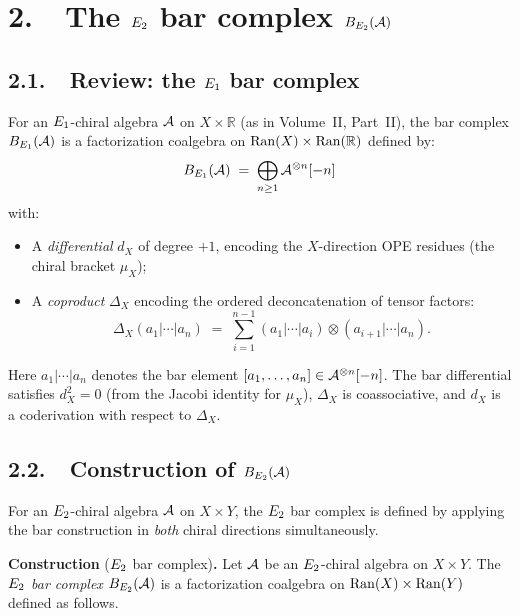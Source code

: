 \section*{2.\ \ The $E_2$ bar complex $B_{E_2}(\mathcal{A})$}
\label{note:sec:e2-bar}

\subsection*{2.1.\ \ Review: the $E_1$ bar complex}

For an $E_1$-chiral algebra $\mathcal{A}$ on $X \times \mathbb{R}$ (as in
Volume~II, Part~II), the bar complex $B_{E_1}(\mathcal{A})$ is a factorization
coalgebra on $\mathrm{Ran}(X) \times \mathrm{Ran}(\mathbb{R})$ defined by:
\[
 B_{E_1}(\mathcal{A})
 \;=\;
 \bigoplus_{n \geq 1} \mathcal{A}^{\otimes n}[-n]
\]
with:
\begin{itemize}
 \item A \emph{differential} $d_X$ of degree $+1$, encoding the
 $X$-direction OPE residues (the chiral bracket $\mu_X$);
 \item A \emph{coproduct} $\Delta_X$ encoding the ordered
 deconcatenation of tensor factors:
 \[
 \Delta_X(a_1 | \cdots | a_n)
 \;=\;
 \sum_{i=1}^{n-1}
 (a_1 | \cdots | a_i) \otimes (a_{i+1} | \cdots | a_n).
 \]
\end{itemize}
Here $a_1 | \cdots | a_n$ denotes the bar element
$[a_1, \ldots, a_n] \in \mathcal{A}^{\otimes n}[-n]$.
The bar differential satisfies $d_X^2 = 0$ (from the Jacobi identity
for $\mu_X$), $\Delta_X$ is coassociative, and $d_X$ is a coderivation
with respect to $\Delta_X$.

\subsection*{2.2.\ \ Construction of $B_{E_2}(\mathcal{A})$}

For an $E_2$-chiral algebra $\mathcal{A}$ on $X \times Y$, the $E_2$ bar
complex is defined by applying the bar construction in \emph{both}
chiral directions simultaneously.

\medskip
\noindent\textbf{Construction} ($E_2$ bar complex)\textbf{.}\;
Let $\mathcal{A}$ be an $E_2$-chiral algebra on $X \times Y$. The
\emph{$E_2$ bar complex} $B_{E_2}(\mathcal{A})$ is a factorization
coalgebra on $\mathrm{Ran}(X) \times \mathrm{Ran}(Y)$ defined as follows.

